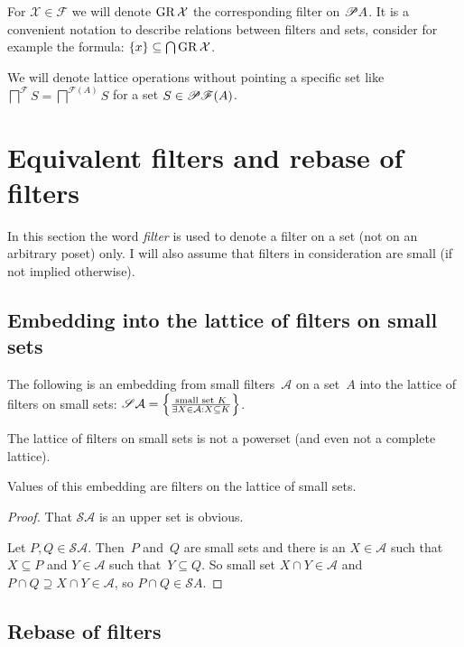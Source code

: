 For $\mathcal{X}\in\mathscr{F}$ we will denote $\operatorname{GR}\mathcal{X}$
the corresponding filter on $\mathscr{P} A$. It is a convenient notation
to describe relations between filters and sets, consider for example
the formula: $\{x\}\subseteq\bigcap\operatorname{GR}\mathcal{X}$.

We will denote lattice operations without pointing a specific set
like $\bigsqcap^{\mathscr{F}}S=\bigsqcap^{\mathscr{F}(A)}S$ for a
set $S\in\mathscr{P}\mathscr{F}(A)$.

\section{Equivalent filters and rebase of filters}

In this section the word \emph{filter} is used to denote a filter on a set (not on an arbitrary poset) only.
I will also assume that filters in consideration are small
(if not implied otherwise).

\subsection{Embedding into the lattice of filters on small sets}

The following is an embedding from small
filters~$\mathcal{A}$ on a set~$A$ into the lattice of
filters on small sets:
$\mathscr{S}\mathcal{A}=\left\{ \frac{\text{small set }K}{
\exists X\in\mathcal{A}:X\subseteq K}\right\}$.

\begin{note}
The lattice of filters on small sets is not a powerset (and
even not a complete lattice).
\end{note}

\begin{prop}
Values of this embedding are filters on the lattice of small
sets.
\end{prop}

\begin{proof}
That $\mathscr{S}\mathcal{A}$ is an upper set is obvious.

Let $P,Q\in\mathscr{S}\mathcal{A}$. Then~$P$ and~$Q$ are
small sets and there is an $X\in\mathcal{A}$ such
that~$X\subseteq P$ and $Y\in\mathcal{A}$ such
that~$Y\subseteq Q$. So small set $X\cap Y\in\mathcal{A}$
and $P\cap Q\supseteq X\cap Y\in\mathcal{A}$, so
$P\cap Q\in\mathscr{S}A$.
\end{proof}

\subsection{Rebase of filters}

